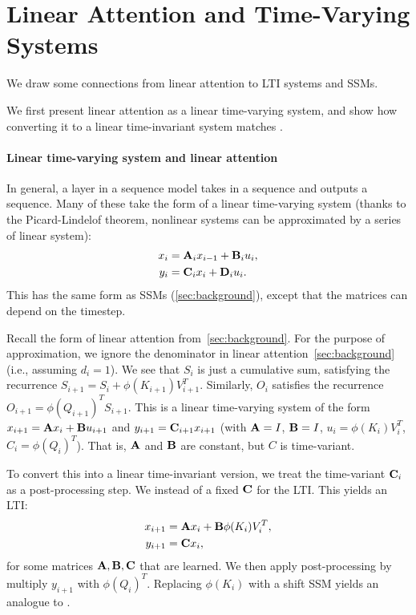 \section{Linear Attention and Time-Varying Systems}
\label{app:linear_attention}

We draw some connections from linear attention to LTI systems and SSMs.

We first present linear attention as a linear time-varying system, and show how converting it to a linear time-invariant system matches \hthree.

\paragraph{Linear time-varying system and linear attention}

In general, a layer in a sequence model takes in a sequence and outputs a
sequence.
Many of these take the form of a linear time-varying system (thanks to the
Picard-Lindelof theorem, nonlinear systems can be approximated by a series of
linear system):
\begin{align*}
  x_i &= \mathbf{A}_i x_{i-1} + \mathbf{B}_i u_i, \\
  y_i &= \mathbf{C}_i x_i + \mathbf{D}_i u_i.
\end{align*}
This has the same form as SSMs (\cref{sec:background}), except that the matrices
can depend on the timestep.

Recall the form of linear attention from~\cref{sec:background}.
For the purpose of approximation, we ignore the denominator in linear
attention~\cref{sec:background} (i.e., assuming $d_i = 1$).
We see that $S_i$ is just a cumulative sum, satisfying the recurrence $S_{i+1} = S_{i} + \phi(K_{i+1}) V_{i+1}^T$.
Similarly, $O_i$ satisfies the recurrence $O_{i+1} = \phi(Q_{i+1})^T S_{i+1}$.
This is a linear time-varying system of the form $x_{i+1} = \mathbf{A} x_i + \mathbf{B} u_{i+1}$ and
$y_{i+1} = \mathbf{C}_{i+1} x_{i+1}$ (with $\mathbf{A} = I$, $\mathbf{B} = I$, $u_{i} = \phi(K_{i}) V_i^T$,
$C_{i} = \phi(Q_{i})^T$).
That is, $\mathbf{A}$ and $\mathbf{B}$ are constant, but $C$ is time-variant.

To convert this into a linear time-invariant version, we treat the time-variant $\mathbf{C}_i$ as a post-processing step.
We instead of a fixed $\mathbf{C}$ for the LTI.
This yields an LTI:
\begin{align*}
  x_{i+1} &= \mathbf{A} x_i + \mathbf{B} \phi(K_{i}) V_i^T, \\
  y_{i+1} &= \mathbf{C} x_{i},
\end{align*}
for some matrices $\mathbf{A}, \mathbf{B}, \mathbf{C}$ that are learned.
We then apply post-processing by multiply $y_{i+1}$ with $\phi(Q_i)^T$.
Replacing $\phi(K_{i})$ with a shift SSM yields an analogue to \hthree.
